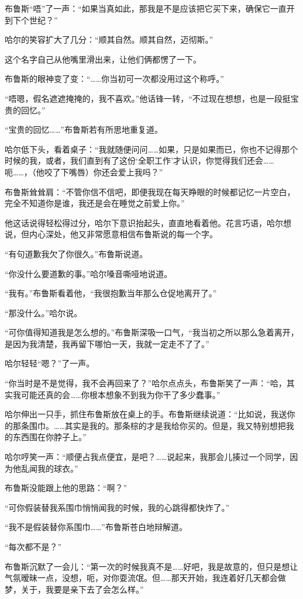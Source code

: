 \documentclass[../main]{subfiles}
\begin{document}
布鲁斯“唔”了一声：“如果当真如此，那我是不是应该把它买下来，确保它一直开到下个世纪？”

哈尔的笑容扩大了几分：“顺其自然。顺其自然，迈彻斯。”

这个名字自己从他嘴里滑出来，让他们俩都愣了一下。

布鲁斯的眼神变了变：“……你当初可一次都没用过这个称呼。”

“唔嗯，假名遮遮掩掩的，我不喜欢。”他话锋一转，“不过现在想想，也是一段挺宝贵的回忆。”

“宝贵的回忆……”布鲁斯若有所思地重复道。

哈尔低下头，看着桌子：“我就随便问问……如果，只是如果而已，你也不记得那个时候的我，或者，我们直到有了这份‘全职工作’才认识，你觉得我们还会……呃……，（他咬了下嘴唇）你还会爱上我吗？”

布鲁斯耸耸肩：“不管你信不信吧，即便我现在每天睁眼的时候都记忆一片空白，完全不知道你是谁，我还是会在睡觉之前爱上你。”

他这话说得轻松得过分，哈尔下意识抬起头，直直地看着他。花言巧语，哈尔想说，但内心深处，他又非常愿意相信布鲁斯说的每一个字。

“有句道歉我欠了你很久。”布鲁斯说道。

“你没什么要道歉的事。”哈尔嗓音嘶哑地说道。

“我有。”布鲁斯看着他，“我很抱歉当年那么仓促地离开了。”

“那没什么。”哈尔说。

“可你值得知道我是怎么想的。”布鲁斯深吸一口气，“我当初之所以那么急着离开，是因为我清楚，我再留下哪怕一天，我就一定走不了了。”

哈尔轻轻“嗯？”了一声。

“你当时是不是觉得，我不会再回来了？”哈尔点点头，布鲁斯笑了一声：“哈，其实我可能还真的会……你根本想象不到我为你干了多少蠢事。”

哈尔伸出一只手，抓住布鲁斯放在桌上的手。布鲁斯继续说道：“比如说，我送你的那条围巾。……其实是我的。那条棕的才是我给你买的。但是，我又特别想把我的东西围在你脖子上。”

哈尔哼笑一声：“顺便占我点便宜，是吧？……说起来，我那会儿揍过一个同学，因为他乱闻我的球衣。”

布鲁斯没能跟上他的思路：“啊？”

“可你假装替我系围巾悄悄闻我的时候，我的心跳得都快炸了。”

“我不是假装替你系围巾……”布鲁斯苍白地辩解道。

“每次都不是？”

布鲁斯沉默了一会儿：“第一次的时候我真不是……好吧，我是故意的，但只是想让气氛暧昧一点，没想，呃，对你耍流氓。但……那天开始，我连着好几天都会做梦，关于，我要是亲下去了会怎么样。”
\end{document}
